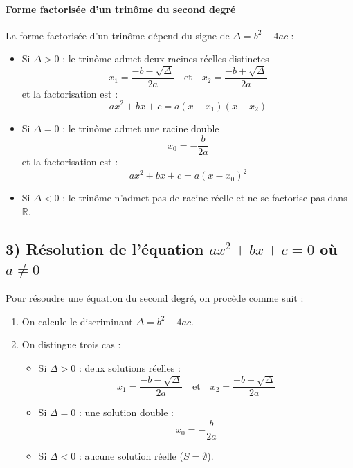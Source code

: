 \documentclass[12pt,a4paper]{article}
\newcounter{solution}
\begin{document}
\paragraph*{\color{myred} Forme factorisée d'un trinôme du second degré}
La forme factorisée d'un trinôme dépend du signe de $\Delta = b^2 - 4ac$ :

\begin{itemize}
    \item Si $\Delta > 0$ : le trinôme admet deux racines réelles distinctes
    \[
    x_1 = \dfrac{-b - \sqrt{\Delta}}{2a} \quad \text{et} \quad x_2 = \dfrac{-b + \sqrt{\Delta}}{2a}
    \]
    et la factorisation est :
    \[
    ax^2 + bx + c = a(x - x_1)(x - x_2)
    \]
    
    \item Si $\Delta = 0$ : le trinôme admet une racine double
    \[
    x_0 = -\dfrac{b}{2a}
    \]
    et la factorisation est :
    \[
    ax^2 + bx + c = a(x - x_0)^2
    \]
    
    \item Si $\Delta < 0$ : le trinôme n'admet pas de racine réelle et ne se factorise pas dans $\mathbb{R}$.
\end{itemize}

\subsection*{\color{myred} 3) Résolution de l'équation $ax^2 + bx + c = 0$ où $a \neq 0$}
Pour résoudre une équation du second degré, on procède comme suit :

\begin{enumerate}
    \item On calcule le discriminant $\Delta = b^2 - 4ac$.
    \item On distingue trois cas :
    \begin{itemize}
        \item Si $\Delta > 0$ : deux solutions réelles :
        \[
        x_1 = \dfrac{-b - \sqrt{\Delta}}{2a} \quad \text{et} \quad x_2 = \dfrac{-b + \sqrt{\Delta}}{2a}
        \]
        \item Si $\Delta = 0$ : une solution double :
        \[
        x_0 = -\dfrac{b}{2a}
        \]
        \item Si $\Delta < 0$ : aucune solution réelle ($S = \emptyset$).
    \end{itemize}
\end{enumerate}
\end{document}

